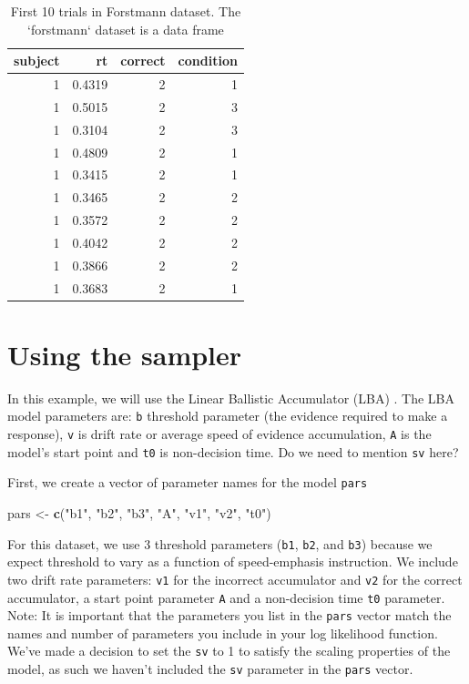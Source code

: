 \documentclass[]{book}
\newenvironment{Shaded}{\begin{snugshade}}{\end{snugshade}}
\newcommand{\KeywordTok}[1]{\textcolor[rgb]{0.13,0.29,0.53}{\textbf{#1}}}
\newcommand{\StringTok}[1]{\textcolor[rgb]{0.31,0.60,0.02}{#1}}
\newcommand{\NormalTok}[1]{#1}
\begin{document}
\begin{table}

\caption{\label{tab:forsthead10}First 10 trials in Forstmann dataset. The `forstmann` dataset is a data frame }
\centering
\begin{tabular}[t]{r|r|r|r}
\hline
subject & rt & correct & condition\\
\hline
1 & 0.4319 & 2 & 1\\
\hline
1 & 0.5015 & 2 & 3\\
\hline
1 & 0.3104 & 2 & 3\\
\hline
1 & 0.4809 & 2 & 1\\
\hline
1 & 0.3415 & 2 & 1\\
\hline
1 & 0.3465 & 2 & 2\\
\hline
1 & 0.3572 & 2 & 2\\
\hline
1 & 0.4042 & 2 & 2\\
\hline
1 & 0.3866 & 2 & 2\\
\hline
1 & 0.3683 & 2 & 1\\
\hline
\end{tabular}
\end{table}

\section{Using the sampler}\label{using-the-sampler}

In this example, we will use the Linear Ballistic Accumulator (LBA)
\citet{brown2008simplest}. The LBA model parameters are: \texttt{b}
threshold parameter (the evidence required to make a response),
\texttt{v} is drift rate or average speed of evidence accumulation,
\texttt{A} is the model's start point and \texttt{t0} is non-decision
time. Do we need to mention \texttt{sv} here?

First, we create a vector of parameter names for the model \texttt{pars}

\begin{Shaded}
\begin{Highlighting}[]
\NormalTok{pars <-}\StringTok{ }\KeywordTok{c}\NormalTok{(}\StringTok{"b1"}\NormalTok{, }\StringTok{"b2"}\NormalTok{, }\StringTok{"b3"}\NormalTok{, }\StringTok{"A"}\NormalTok{, }\StringTok{"v1"}\NormalTok{, }\StringTok{"v2"}\NormalTok{, }\StringTok{"t0"}\NormalTok{)}
\end{Highlighting}
\end{Shaded}

For this dataset, we use 3 threshold parameters (\texttt{b1},
\texttt{b2}, and \texttt{b3}) because we expect threshold to vary as a
function of speed-emphasis instruction. We include two drift rate
parameters: \texttt{v1} for the incorrect accumulator and \texttt{v2}
for the correct accumulator, a start point parameter \texttt{A} and a
non-decision time \texttt{t0} parameter. Note: It is important that the
parameters you list in the \texttt{pars} vector match the names and
number of parameters you include in your log likelihood function. We've
made a decision to set the \texttt{sv} to 1 to satisfy the scaling
properties of the model, as such we haven't included the \texttt{sv}
parameter in the \texttt{pars} vector.
\end{document}
